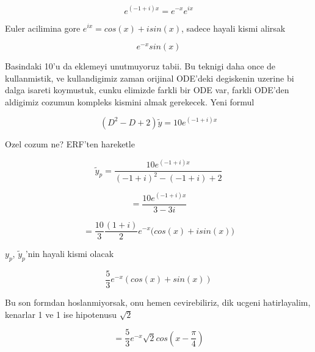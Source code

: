 \documentclass[12pt,fleqn]{article}
\begin{document}
\[ e ^{(-1 + i)x} = e^{-x} e^{ix} \]

Euler acilimina gore $e^{ix} = cos(x) + isin(x)$, sadece hayali kismi alirsak

\[ e^{-x} sin(x)  \]

Basindaki 10'u da eklemeyi unutmuyoruz tabii. Bu teknigi daha once de
kullanmistik, ve kullandigimiz zaman orijinal ODE'deki degiskenin uzerine
bi dalga isareti koymustuk, cunku elimizde farkli bir ODE var, farkli
ODE'den aldigimiz cozumun kompleks kismini almak gerekecek. Yeni formul

\[ (D^2 - D + 2)\tilde{y} = 10 e ^{(-1 + i)x} \]

Ozel cozum ne? ERF'ten hareketle

\[ \tilde{y}_p = \frac{10 e^{(-1+i)x}}{(-1+i)^2 - (-1+i) + 2} \]

\[  = \frac{10 e^{(-1+i)x}}{3 - 3i} \]

\[ = \frac{10}{3}\frac{(1+i)}{2} e^{-x} \bigg( cos(x) + isin(x) \bigg)\]

$y_p$, $\tilde{y}_p$'nin hayali kismi olacak

\[ \frac{5}{3}e^{-x}( cos(x) + sin(x)) \]

Bu son formdan hoslanmiyorsak, onu hemen cevirebiliriz, dik ucgeni
hatirlayalim, kenarlar 1 ve 1 ise hipotenusu $\sqrt{2}$

\[ = \frac{5}{3}e^{-x} \sqrt{2}cos(x - \frac{\pi}{4})\]
\end{document}
